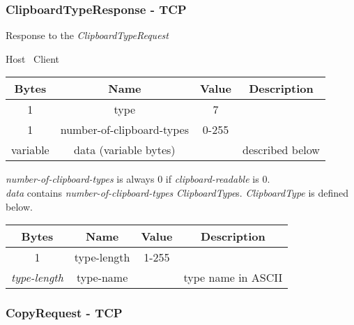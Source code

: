 \documentclass{article}
\begin{document}
    \subsubsection{ClipboardTypeResponse - TCP}

    Response to the \emph{ClipboardTypeRequest}

    \begin{center}
        Host \textrightarrow\ Client\\
        \begin{tabular}{|c|c|c|c|}
            \hline
            \textbf{Bytes} & \textbf{Name}             & \textbf{Value} & \textbf{Description} \\
            \hline
            1              & type                      & 7              &                      \\
            \hline
            1              & number-of-clipboard-types & 0-255          &                      \\
            \hline
            variable       & data (variable bytes)     &                & described below      \\
            \hline
        \end{tabular}
    \end{center}

    \emph{number-of-clipboard-types} is always 0 if \emph{clipboard-readable} is 0.\\

    \emph{data} contains \emph{number-of-clipboard-types} \emph{ClipboardType}s. \emph{ClipboardType} is defined below.

    \begin{center}
        \begin{tabular}{|c|c|c|c|}
            \hline
            \textbf{Bytes}     & \textbf{Name} & \textbf{Value} & \textbf{Description} \\
            \hline
            1                  & type-length   & 1-255          &                      \\
            \hline
            \emph{type-length} & type-name     &                & type name in ASCII   \\
            \hline
        \end{tabular}
    \end{center}

    \subsubsection{CopyRequest - TCP}
\end{document}
